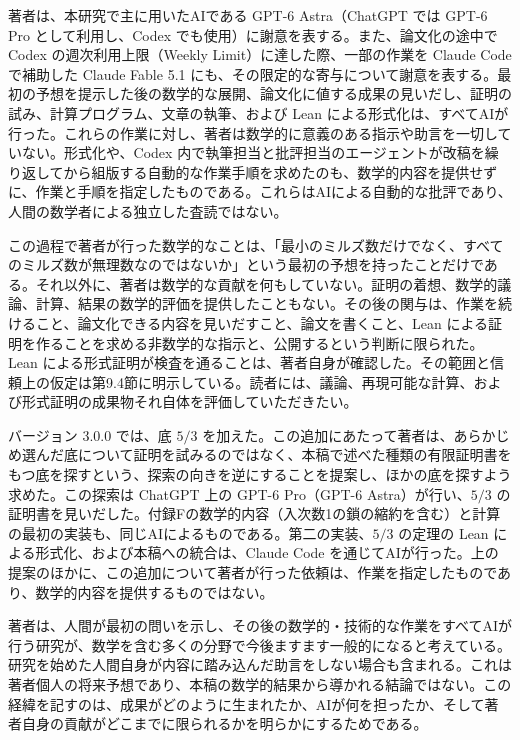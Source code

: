 \documentclass[11pt,reqno]{amsart}
\theoremstyle{definition}
\theoremstyle{definition}
\theoremstyle{remark}
\begin{document}
著者は、本研究で主に用いたAIである GPT-6 Astra（ChatGPT では GPT-6 Pro として利用し、Codex でも使用）に謝意を表する。また、論文化の途中で Codex の週次利用上限（Weekly Limit）に達した際、一部の作業を Claude Code で補助した Claude Fable 5.1 にも、その限定的な寄与について謝意を表する。最初の予想を提示した後の数学的な展開、論文化に値する成果の見いだし、証明の試み、計算プログラム、文章の執筆、および Lean による形式化は、すべてAIが行った。これらの作業に対し、著者は数学的に意義のある指示や助言を一切していない。形式化や、Codex 内で執筆担当と批評担当のエージェントが改稿を繰り返してから組版する自動的な作業手順を求めたのも、数学的内容を提供せずに、作業と手順を指定したものである。これらはAIによる自動的な批評であり、人間の数学者による独立した査読ではない。

この過程で著者が行った数学的なことは、「最小のミルズ数だけでなく、すべてのミルズ数が無理数なのではないか」という最初の予想を持ったことだけである。それ以外に、著者は数学的な貢献を何もしていない。証明の着想、数学的議論、計算、結果の数学的評価を提供したこともない。その後の関与は、作業を続けること、論文化できる内容を見いだすこと、論文を書くこと、Lean による証明を作ることを求める非数学的な指示と、公開するという判断に限られた。Lean による形式証明が検査を通ることは、著者自身が確認した。その範囲と信頼上の仮定は第9.4節に明示している。読者には、議論、再現可能な計算、および形式証明の成果物それ自体を評価していただきたい。

バージョン 3.0.0 では、底 \(5/3\) を加えた。この追加にあたって著者は、あらかじめ選んだ底について証明を試みるのではなく、本稿で述べた種類の有限証明書をもつ底を探すという、探索の向きを逆にすることを提案し、ほかの底を探すよう求めた。この探索は ChatGPT 上の GPT-6 Pro（GPT-6 Astra）が行い、\(5/3\) の証明書を見いだした。付録Fの数学的内容（入次数1の鎖の縮約を含む）と計算の最初の実装も、同じAIによるものである。第二の実装、\(5/3\) の定理の Lean による形式化、および本稿への統合は、Claude Code を通じてAIが行った。上の提案のほかに、この追加について著者が行った依頼は、作業を指定したものであり、数学的内容を提供するものではない。

著者は、人間が最初の問いを示し、その後の数学的・技術的な作業をすべてAIが行う研究が、数学を含む多くの分野で今後ますます一般的になると考えている。研究を始めた人間自身が内容に踏み込んだ助言をしない場合も含まれる。これは著者個人の将来予想であり、本稿の数学的結果から導かれる結論ではない。この経緯を記すのは、成果がどのように生まれたか、AIが何を担ったか、そして著者自身の貢献がどこまでに限られるかを明らかにするためである。
\end{document}
